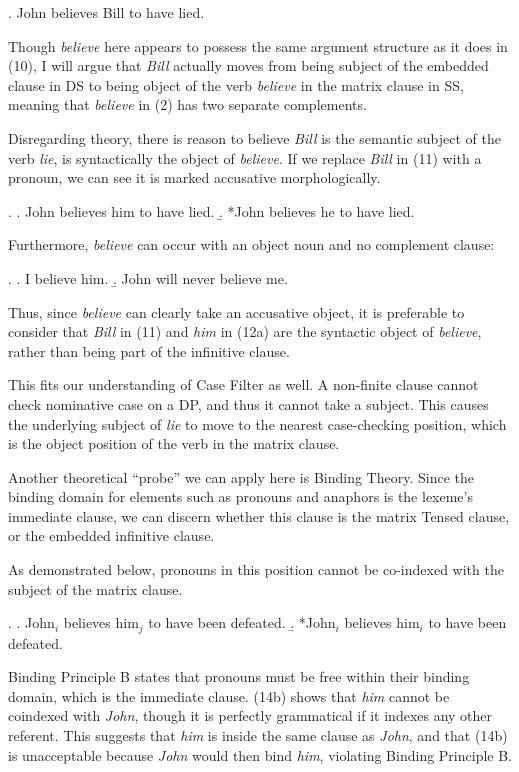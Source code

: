 \documentclass[a4paper, 11pt]{article}
\begin{document}
\begin{enumerate}[label=\textbf{\arabic*.}]
	\ex. John believes Bill to have lied.

	Though \emph{believe} here appears to possess the same argument structure as it does in (10), I will argue
	that \emph{Bill} actually moves from being subject of the embedded clause in DS to being object of the
	verb \emph{believe} in the matrix clause in SS, meaning that \emph{believe} in (2) has two separate
	complements.

	Disregarding theory, there is reason to believe \emph{Bill} is the semantic subject of the verb \emph{lie},
	is syntactically the object of \emph{believe}. If we replace \emph{Bill} in (11) with a pronoun, we can see
	it is marked accusative morphologically.

	\ex. 
		\a. John believes him to have lied.
		\b. *John believes he to have lied.

	Furthermore, \emph{believe} can occur with an object noun and no complement clause:

	\ex.
		\a. I believe him.
		\b. John will never believe me.

	Thus, since \emph{believe} can clearly take an accusative object, it is preferable to consider that \emph{Bill}
	in (11) and \emph{him} in (12a) are the syntactic object of \emph{believe}, rather than being part of the
	infinitive clause.

	This fits our understanding of Case Filter as well. A non-finite clause cannot check nominative case on a
	DP, and thus it cannot take a subject. This causes the underlying subject of \emph{lie} to move to the
	nearest case-checking position, which is the object position of the verb in the matrix clause.

	Another theoretical ``probe'' we can apply here is Binding Theory. Since the binding domain for elements
	such as pronouns and anaphors is the lexeme's immediate clause, we can discern whether this clause
	is the matrix Tensed clause, or the embedded infinitive clause.

	As demonstrated below, pronouns in this position cannot be co-indexed with the subject of the matrix
	clause.

	\ex. 
		\a. John$_{i}$ believes him$_{j}$ to have been defeated.
		\b. *John$_{i}$ believes him$_{i}$ to have been defeated.

	Binding Principle B states that pronouns must be free within their binding domain, which is the
	immediate clause. (14b) shows that \emph{him} cannot be coindexed with \emph{John}, though it is
	perfectly grammatical if it indexes any other referent. This suggests that \emph{him} is inside the same
	clause as \emph{John}, and that (14b) is unacceptable because \emph{John} would then bind \emph{him},
	violating Binding Principle B.


\end{enumerate}
\end{document}

